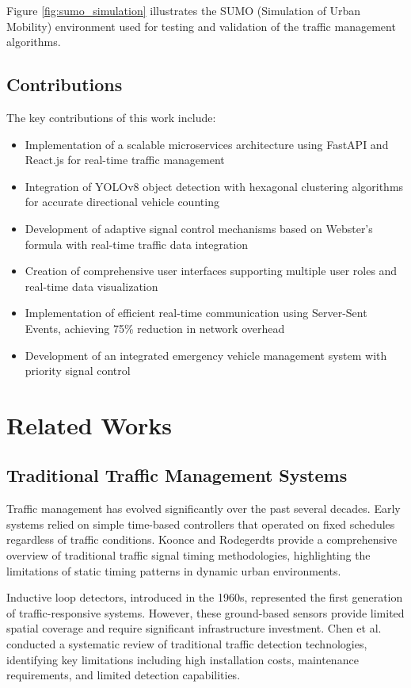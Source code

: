 \documentclass[conference]{IEEEtran}
\begin{document}
Figure \ref{fig:sumo_simulation} illustrates the SUMO (Simulation of Urban Mobility) environment used for testing and validation of the traffic management algorithms.

\subsection{Contributions}

The key contributions of this work include:

\begin{itemize}
\item Implementation of a scalable microservices architecture using FastAPI and React.js for real-time traffic management
\item Integration of YOLOv8 object detection with hexagonal clustering algorithms for accurate directional vehicle counting
\item Development of adaptive signal control mechanisms based on Webster's formula with real-time traffic data integration
\item Creation of comprehensive user interfaces supporting multiple user roles and real-time data visualization
\item Implementation of efficient real-time communication using Server-Sent Events, achieving 75\% reduction in network overhead
\item Development of an integrated emergency vehicle management system with priority signal control
\end{itemize}

\section{Related Works}

\subsection{Traditional Traffic Management Systems}

Traffic management has evolved significantly over the past several decades. Early systems relied on simple time-based controllers that operated on fixed schedules regardless of traffic conditions. Koonce and Rodegerdts provide a comprehensive overview of traditional traffic signal timing methodologies, highlighting the limitations of static timing patterns in dynamic urban environments\cite{koonce2008traffic}.

Inductive loop detectors, introduced in the 1960s, represented the first generation of traffic-responsive systems. However, these ground-based sensors provide limited spatial coverage and require significant infrastructure investment. Chen et al. conducted a systematic review of traditional traffic detection technologies, identifying key limitations including high installation costs, maintenance requirements, and limited detection capabilities\cite{chen2020comprehensive}.
\end{document}
